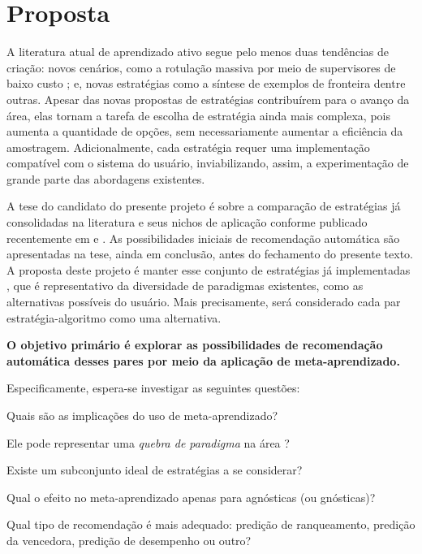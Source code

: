 \section{Proposta}\label{pr}
A literatura atual de aprendizado ativo segue pelo menos duas tendências de criação:
novos cenários, como a rotulação massiva por meio de supervisores de baixo custo \citep{journals/ijcv/VijayanarasimhanG14};
e, novas estratégias como a síntese de exemplos de fronteira \citep{journals/ijon/WangHYL15}
dentre outras.
Apesar das novas propostas de estratégias contribuírem para o avanço da área,
elas tornam a tarefa de escolha de estratégia ainda mais complexa,
pois aumenta a quantidade de opções, sem necessariamente aumentar a eficiência
da amostragem.
Adicionalmente, cada estratégia requer uma implementação compatível com o sistema do usuário,
inviabilizando, assim, a experimentação de grande parte das abordagens existentes.

A tese do candidato do presente projeto é sobre a comparação de estratégias já
consolidadas na literatura e seus nichos de aplicação conforme publicado recentemente
em \cite{santos2014viabilidade} e \cite{conf/hais/SantosC14}.
As possibilidades iniciais de recomendação automática são apresentadas na tese,
ainda em conclusão, antes do fechamento do presente texto.
A proposta deste projeto é manter esse conjunto de estratégias já implementadas
\citep{doi/al}, que é representativo da diversidade de paradigmas existentes, 
como as alternativas possíveis do usuário.
Mais precisamente, será considerado cada par estratégia-algoritmo como
uma alternativa.

\textbf{O objetivo primário é explorar as possibilidades de recomendação automática
desses pares por meio da aplicação de meta-aprendizado.}

Especificamente, espera-se investigar as seguintes questões:
\begin{compactenum}
\item{Quais são as implicações do uso de meta-aprendizado?}
\item{Ele pode representar uma \textit{quebra de paradigma} na área \citep{kuhn2012structure}?}
\item{Existe um subconjunto ideal de estratégias a se considerar?}
\item{Qual o efeito no meta-aprendizado apenas para agnósticas (ou gnósticas)?}
\item{Qual tipo de recomendação é mais adequado: 
predição de ranqueamento, predição da vencedora, predição de desempenho ou outro?}
\end{compactenum}

